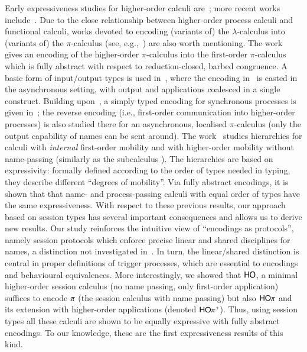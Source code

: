 Early expressiveness studies for higher-order calculi are~\cite{Tho90,SangiorgiD:expmpa}; 
more recent works include~\cite{BundgaardHG06,DBLP:conf/icalp/LanesePSS10,DBLP:journals/iandc/LanesePSS11,XuActa2012,DBLP:conf/wsfm/XuYL13}.
Due to the close relationship between higher-order process calculi and functional calculi, 
works devoted to encoding (variants of) the $\lambda$-calculus into (variants of) the $\pi$-calculus (see, e.g.,~\cite{San92,DBLP:journals/tcs/Fu99,DBLP:journals/iandc/YoshidaBH04,BHY,DBLP:conf/concur/SangiorgiX14}) are also worth mentioning.
The work~\cite{SangiorgiD:expmpa} gives an encoding of the higher-order $\pi$-calculus
into the first-order $\pi$-calculus which is fully abstract with respect to reduction-closed, barbed congruence. 
A basic form of input/output types is used in~\cite{DBLP:journals/tcs/Sangiorgi01}, where the encoding in~\cite{SangiorgiD:expmpa} is casted in the asynchronous setting, with output and applications coalesced in a single construct. Building upon~\cite{DBLP:journals/tcs/Sangiorgi01}, 
a simply typed encoding for synchronous processes is given in~\cite{SaWabook}; the reverse encoding (i.e.,  first-order communication into higher-order processes) is also studied there for an asynchronous, localised $\pi$-calculus (only the output capability of names can be sent around).
The work~\cite{San96int} studies hierarchies for calculi with \emph{internal} first-order mobility and 
with higher-order mobility without name-passing (similarly as the subcalculus \HO). 
The hierarchies are based on expressivity: 
formally defined according to the order of types needed in typing, 
they describe different ``degrees of mobility''.
Via fully abstract encodings, it is shown that that name- and process-passing calculi with equal order of types have the same expressiveness.
With respect to these previous results, our approach based on session types 
has several important consequences and allows us to derive new results.  Our study reinforces the intuitive view of ``encodings as protocols'', namely session protocols which enforce precise linear and shared disciplines for names, a distinction not investigated in~\cite{SangiorgiD:expmpa,DBLP:journals/tcs/Sangiorgi01}. 
In turn, the linear/shared distinction is central in proper definitions of trigger processes, which are essential to encodings and behavioural equivalences.
More interestingly, we showed that $\mathsf{HO}$, a  minimal higher-order session calculus (no name passing, only first-order application) suffices to encode $\pi$ (the session calculus with name passing) but also 
$\mathsf{HO}\pi$  and 
its extension  with higher-order applications (denoted $\mathsf{HO}\pi^{\mathsf +}$). 
Thus, using session types all these calculi are shown to be equally expressive with fully abstract encodings.
To our knowledge, these are the first expressiveness results of this kind.

